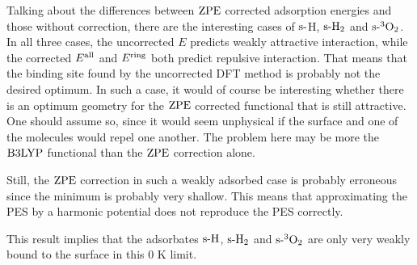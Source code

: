 Talking about the differences between $\text{ZPE}$ corrected adsorption energies
and those without correction, there are the interesting cases of 
$\text{s-}$H, $\text{s-}\text H_2$ and $\text{s-}{^3\ensuremath{\text O_2}}$. In all three cases, the uncorrected
$E$ predicts weakly attractive interaction, while the corrected $E^{\text{all}}$
and $E^{\text{ring}}$ both predict repulsive interaction. That means that
the binding site found by the uncorrected DFT method is probably not the
desired optimum.
In such a case, it would of
course be interesting whether there is an optimum geometry for the $\text{ZPE}$
corrected functional that is still attractive. One should assume so,
since it would seem unphysical if the surface and one of the
molecules would repel one another. The problem here may be more the
$\text{B3LYP}$ functional than the $\text{ZPE}$ correction alone. 

Still, the $\text{ZPE}$ correction in such a weakly adsorbed case is probably
erroneous since the minimum is probably very shallow. This means
that approximating the PES by a harmonic potential does not reproduce the PES
correctly.

This result implies that the adsorbates $\text{s-}{\text H}$, $\text{s-}{\ensuremath{\text H_2}}$ and
$\text{s-}{\ensuremath{{^3\text O_2}}}$ are only very weakly bound to the surface in this 0 K limit.


